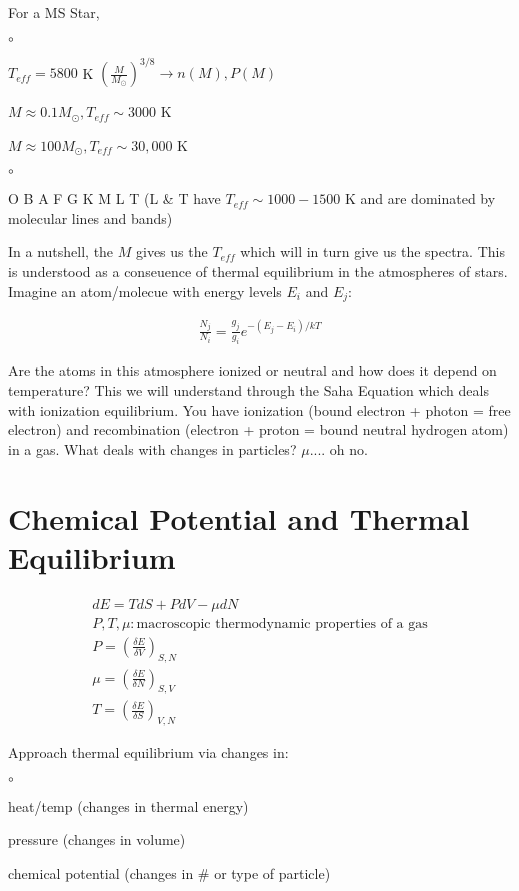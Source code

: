 \documentclass[10pt,letterpaper,final]{book}
\newcommand{\rp}{\right)}
\newcommand{\lp}{\left(}
\newcommand{\mfrac}{\lp \frac{M}{M_\odot}\rp}
\newcommand{\ra}{\rightarrow}
\begin{document}
For a MS Star,
\begin{list}{$\circ$}{}
\item $T_{eff} = 5800$ K $\mfrac^{3/8} \ra n(M), P(M)$
\item $M \approx 0.1 M_\odot, T_{eff} \sim 3000$ K
\item $M \approx 100M_\odot, T_{eff} \sim 30,000$ K
\end{list}  

\begin{list}{$\circ$}{}
\item O B A F G K M L T (L \& T have $T_{eff} \sim 1000 - 1500$ K and are dominated by molecular lines and bands)
\end{list}

In a nutshell, the $M$ gives us the $T_{eff}$ which will in turn give us the spectra. This is understood as a conseuence of thermal equilibrium in the atmospheres of stars. Imagine an atom/molecue with energy levels $E_i$ and $E_j$:

\begin{align}
\frac{N_j}{N_i} = \frac{g_j}{g_i}e^{-(E_j - E_i)/kT}
\end{align}

Are the atoms in this atmosphere ionized or neutral and how does it depend on temperature? This we will understand through the Saha Equation which deals with ionization equilibrium. You have ionization (bound electron + photon = free electron) and recombination (electron + proton = bound neutral hydrogen atom) in a gas. What deals with changes in particles? $\mu$.... oh no.

\section{Chemical Potential and Thermal Equilibrium}

\begin{align}
dE = TdS + PdV - \mu dN\\
P,T,\mu: \text{macroscopic thermodynamic properties of a gas}\\
P = \lp \frac{\delta E}{\delta V} \rp_{S,N}\\
\mu = \lp \frac{\delta E}{\delta N} \rp_{S,V}\\
T = \lp \frac{\delta E}{\delta S} \rp_{V,N}
\end{align}

Approach thermal equilibrium via changes in:

\begin{list}{$\circ$}{}
\item heat/temp (changes in thermal energy)
\item pressure (changes in volume)
\item chemical potential (changes in \# or type of particle)
\end{list}
\end{document}
